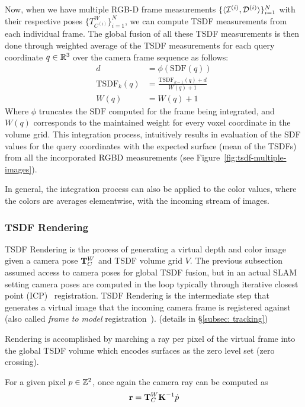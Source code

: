 Now, when we have multiple RGB-D frame measurements $\{\langle \mathcal{I}^{(i)}, \mathcal{D}^{(i)} \rangle\}_{i=1}^{N}$ with their respective poses $\{ T_{C^{(i)}}^W \}_{i=1}^N$, we can compute TSDF measurements from each individual frame. The global fusion of all these TSDF measurements is then done through weighted average of the TSDF measurements for each query coordinate $q \in \mathbb{R}^3$ over the camera frame sequence as follows:
\begin{align}
    d &= \phi(\text{SDF}(q)) \\
    \text{TSDF}_k(q) &= \frac{\text{TSDF}_{k-1}(q) + d}{W(q) + 1} \\
    W(q) &= W(q) + 1
\end{align}
Where $\phi$ truncates the $\text{SDF}$ computed for the frame being integrated, and $W(q)$ corresponds to the maintained weight for every voxel coordinate in the volume grid. This integration process, intuitively results in evaluation of the SDF values for the query coordinates with the expected surface (mean of the TSDFs) from all the incorporated RGBD measurements (see Figure~\ref{fig:tsdf-multiple-images}).


In general, the integration process can also be applied to the color values, where the colors are averages elementwise, with the incoming stream of images.

\subsubsection{TSDF Rendering}

TSDF Rendering is the process of generating a virtual depth and color image given a camera pose $\mathbf{T}_C^W$ and TSDF volume grid $V$. The previous subsection assumed access to camera poses for global TSDF fusion, but in an actual SLAM setting camera poses are computed in the loop typically through iterative closest point (ICP)~\cite{rusinkiewiczEfficientVariantsICP2001} registration. TSDF Rendering is the intermediate step that generates a virtual image that the incoming camera frame is registered against (also called \emph{frame to model} registration~\cite{newcombeKinectFusionRealtimeDense2011}). (details in \S\ref{subsec: tracking})

Rendering is accomplished by marching a ray per pixel of the virtual frame into the global TSDF volume which encodes surfaces as the zero level set (zero crossing).

For a given pixel $p \in \mathbb{Z}^2$, once again the camera ray can be computed as
\begin{align*}
    \mathbf{r} = \mathbf{T}_C^W \mathbf{K}^{-1} \dot{p}
\end{align*}

